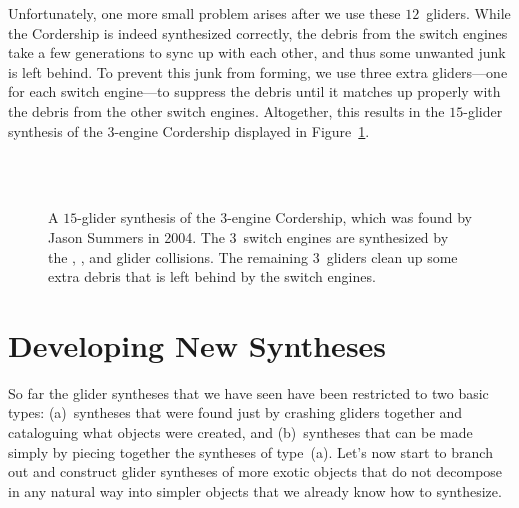 Unfortunately, one more small problem arises after we use these $12$~gliders. While the Cordership is indeed synthesized correctly, the debris from the switch engines take a few generations to sync up with each other, and thus some unwanted junk is left behind. To prevent this junk from forming, we use three extra gliders---one for each switch engine---to suppress the debris until it matches up properly with the debris from the other switch engines. Altogether, this results in the $15$-glider synthesis of the $3$-engine Cordership displayed in Figure~\ref{fig:3_engine_cordership_synthesis}.

\begin{figure}[!ht]
	\centering
	 \\[1em]
	
	 \\[1em]
	
	\caption{A $15$-glider synthesis of the $3$-engine Cordership, which was found by Jason Summers in 2004. The $3$~switch engines are synthesized by the , , and  glider collisions. The remaining $3$~gliders clean up some extra debris that is left behind by the switch engines.}\label{fig:3_engine_cordership_synthesis}
\end{figure}



\section{Developing New Syntheses}\label{sec:new_syntheses}

So far the glider syntheses that we have seen have been restricted to two basic types: (a)~syntheses that were found just by crashing gliders together and cataloguing what objects were created, and (b)~syntheses that can be made simply by piecing together the syntheses of type~(a). Let's now start to branch out and construct glider syntheses of more exotic objects that do not decompose in any natural way into simpler objects that we already know how to synthesize.

